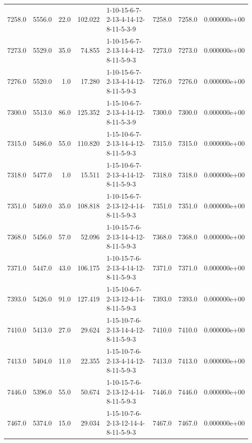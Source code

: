\begin{tabular}{rrrrlrrr}
 7258.0 &  5556.0 &           22.0 &            102.022 &  1-10-15-6-7-2-13-4-14-12-8-11-5-3-9 &        7258.0 &          7258.0 &  0.000000e+00 \\
 7273.0 &  5529.0 &           35.0 &             74.855 &  1-10-15-6-7-2-13-14-4-12-8-11-5-9-3 &        7273.0 &          7273.0 &  0.000000e+00 \\
 7276.0 &  5520.0 &            1.0 &             17.280 &  1-10-15-6-7-2-13-4-14-12-8-11-5-9-3 &        7276.0 &          7276.0 &  0.000000e+00 \\
 7300.0 &  5513.0 &           86.0 &            125.352 &  1-15-10-6-7-2-13-4-14-12-8-11-5-3-9 &        7300.0 &          7300.0 &  0.000000e+00 \\
 7315.0 &  5486.0 &           55.0 &            110.820 &  1-15-10-6-7-2-13-14-4-12-8-11-5-9-3 &        7315.0 &          7315.0 &  0.000000e+00 \\
 7318.0 &  5477.0 &            1.0 &             15.511 &  1-15-10-6-7-2-13-4-14-12-8-11-5-9-3 &        7318.0 &          7318.0 &  0.000000e+00 \\
 7351.0 &  5469.0 &           35.0 &            108.818 &  1-10-15-6-7-2-13-12-4-14-8-11-5-9-3 &        7351.0 &          7351.0 &  0.000000e+00 \\
 7368.0 &  5456.0 &           57.0 &             52.096 &  1-10-15-7-6-2-13-14-4-12-8-11-5-9-3 &        7368.0 &          7368.0 &  0.000000e+00 \\
 7371.0 &  5447.0 &           43.0 &            106.175 &  1-10-15-7-6-2-13-4-14-12-8-11-5-9-3 &        7371.0 &          7371.0 &  0.000000e+00 \\
 7393.0 &  5426.0 &           91.0 &            127.419 &  1-15-10-6-7-2-13-12-4-14-8-11-5-9-3 &        7393.0 &          7393.0 &  0.000000e+00 \\
 7410.0 &  5413.0 &           27.0 &             29.624 &  1-15-10-7-6-2-13-14-4-12-8-11-5-9-3 &        7410.0 &          7410.0 &  0.000000e+00 \\
 7413.0 &  5404.0 &           11.0 &             22.355 &  1-15-10-7-6-2-13-4-14-12-8-11-5-9-3 &        7413.0 &          7413.0 &  0.000000e+00 \\
 7446.0 &  5396.0 &           55.0 &             50.674 &  1-10-15-7-6-2-13-12-4-14-8-11-5-9-3 &        7446.0 &          7446.0 &  0.000000e+00 \\
 7467.0 &  5374.0 &           15.0 &             29.034 &  1-15-10-7-6-2-13-12-14-4-8-11-5-9-3 &        7467.0 &          7467.0 &  0.000000e+00 \\

\end{tabular}
